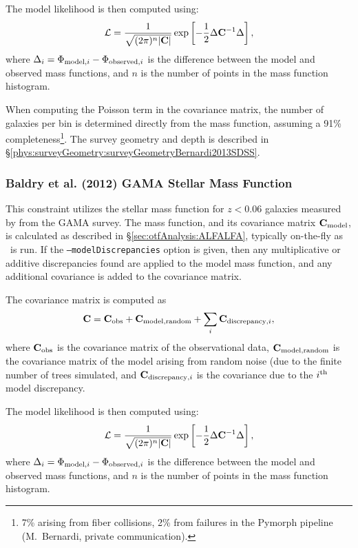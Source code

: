 The model likelihood is then computed using:
\begin{equation}
 \mathcal{L} = {1 \over \sqrt{(2 \pi)^n |{\bf C}|}} \exp\left[ -{1\over 2} \Delta {\bf C}^{-1} \Delta \right],
\end{equation}
where $\Delta_i = \Phi_{{\rm model}, i} - \Phi_{{\rm observed}, i}$ is the difference between the model and observed mass functions, and $n$ is the number of points in the mass function histogram.

When computing the Poisson term in the covariance matrix, the number of galaxies per bin is determined directly from the mass function, assuming a 91\% completeness\footnote{7\% arising from fiber collisions, 2\% from failures in the Pymorph pipeline (M.~Bernardi, private communication).}. The survey geometry and depth is described in \S\ref{phys:surveyGeometry:surveyGeometryBernardi2013SDSS}.

\subsubsection{Baldry et al. (2012) GAMA Stellar Mass Function}\label{sec:AnalysisBaldryGAMAStellarMassFunction}

This constraint utilizes the stellar mass function for $z< 0.06$ galaxies measured by \cite{baldry_galaxy_2012} from the GAMA survey. The mass function, and its covariance matrix ${\bf C}_{\rm model}$, is calculated as described in \S\ref{sec:otfAnalysis:ALFALFA}, typically on-the-fly as \glc\ is run. If the {\tt --modelDiscrepancies} option is given, then any multiplicative or additive discrepancies found are applied to the model mass function, and any additional covariance is added to the covariance matrix.

The covariance matrix is computed as
\begin{equation}
 {\bf C} = {\bf C}_{\rm obs} + {\bf C}_{\rm model,random} + \sum_i {\bf C}_{{\rm discrepancy}, i},
\end{equation}
where ${\bf C}_{\rm obs}$ is the covariance matrix of the observational data, ${\bf C}_{\rm model,random}$ is the covariance matrix of the model arising from random noise (due to the finite number of trees simulated, and ${\bf C}_{{\rm discrepancy}, i}$ is the covariance due to the $i^{\rm th}$ model discrepancy.

The model likelihood is then computed using:
\begin{equation}
 \mathcal{L} = {1 \over \sqrt{(2 \pi)^n |{\bf C}|}} \exp\left[ -{1\over 2} \Delta {\bf C}^{-1} \Delta \right],
\end{equation}
where $\Delta_i = \Phi_{{\rm model}, i} - \Phi_{{\rm observed}, i}$ is the difference between the model and observed mass functions, and $n$ is the number of points in the mass function histogram.

